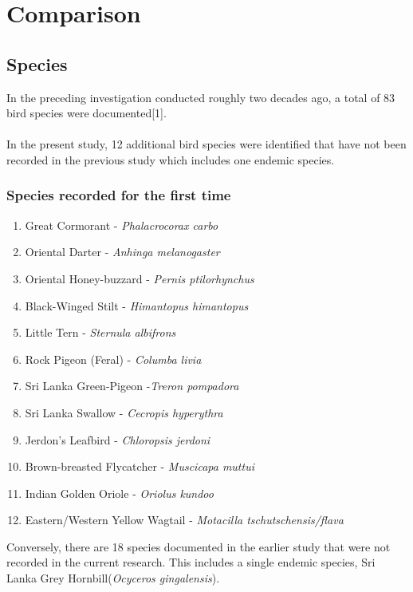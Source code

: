 \chapter{Comparison}
\label{cp:Comparative}
\section{Species}
In the preceding investigation conducted roughly two decades ago, a total of 83 bird species were documented[1]. 
\\\\
In the present study, 12 additional bird species were identified that have not been recorded in the previous study which includes one endemic species. 

\begin{importantbox}
\subsection{Species recorded for the first time}
\begin{enumerate}
    \item Great Cormorant - \textit{Phalacrocorax carbo}
    \item Oriental Darter - \textit{Anhinga melanogaster}
    \item Oriental Honey-buzzard - \textit{Pernis ptilorhynchus}
    \item Black-Winged Stilt - \textit{Himantopus himantopus}
    \item Little Tern - \textit{Sternula albifrons}
    \item Rock Pigeon (Feral) - \textit{Columba livia}
    \item Sri Lanka Green-Pigeon -\textit{Treron pompadora}
    \item Sri Lanka Swallow - \textit{Cecropis hyperythra}
    \item Jerdon's Leafbird - \textit{Chloropsis jerdoni}
    \item Brown-breasted Flycatcher - \textit{Muscicapa muttui}
    \item Indian Golden Oriole - \textit{Oriolus kundoo}
    \item Eastern/Western Yellow Wagtail - \textit{Motacilla tschutschensis/flava}
\end{enumerate}
\end{importantbox}

Conversely, there are 18 species documented in the earlier study that were not recorded in the current research. This includes a single endemic species, Sri Lanka Grey Hornbill(\textit{Ocyceros gingalensis}).
